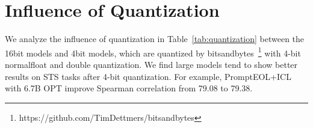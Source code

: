 \documentclass{article}
\begin{document}




\appendix


\newpage

\section{Influence of Quantization}
\label{apx:quant}

We analyze the influence of quantization in Table~\ref{tab:quantization} between the 16bit models and 4bit models, which are quantized by bitsandbytes~\footnote{https://github.com/TimDettmers/bitsandbytes} with 4-bit normalfloat and double quantization.
We find large models tend to show better results on STS tasks after 4-bit quantization.
For example, PromptEOL+ICL with 6.7B OPT improve Spearman correlation from 79.08 to 79.38.
\end{document}

